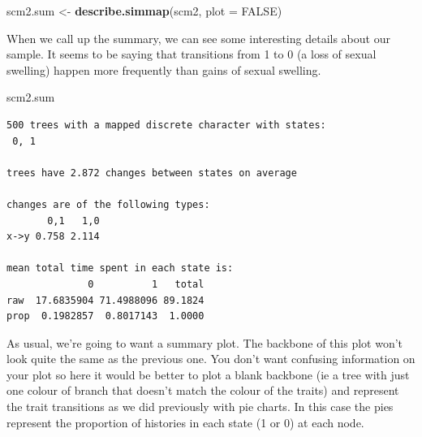 \documentclass[
]{book}
\newenvironment{Shaded}{\begin{snugshade}}{\end{snugshade}}
\newcommand{\DataTypeTok}[1]{\textcolor[rgb]{0.13,0.29,0.53}{#1}}
\newcommand{\KeywordTok}[1]{\textcolor[rgb]{0.13,0.29,0.53}{\textbf{#1}}}
\newcommand{\NormalTok}[1]{#1}
\newcommand{\OtherTok}[1]{\textcolor[rgb]{0.56,0.35,0.01}{#1}}
\newcommand{\StringTok}[1]{\textcolor[rgb]{0.31,0.60,0.02}{#1}}
\begin{document}
\begin{Shaded}
\begin{Highlighting}[]
\NormalTok{scm2.sum \textless{}{-}}\StringTok{ }\KeywordTok{describe.simmap}\NormalTok{(scm2, }\DataTypeTok{plot =} \OtherTok{FALSE}\NormalTok{)}
\end{Highlighting}
\end{Shaded}

When we call up the summary, we can see some interesting details about our sample. It seems to be saying that transitions from 1 to 0 (a loss of sexual swelling) happen more frequently than gains of sexual swelling.

\begin{Shaded}
\begin{Highlighting}[]
\NormalTok{scm2.sum}
\end{Highlighting}
\end{Shaded}

\begin{verbatim}
500 trees with a mapped discrete character with states:
 0, 1 

trees have 2.872 changes between states on average

changes are of the following types:
       0,1   1,0
x->y 0.758 2.114

mean total time spent in each state is:
              0          1   total
raw  17.6835904 71.4988096 89.1824
prop  0.1982857  0.8017143  1.0000
\end{verbatim}

As usual, we're going to want a summary plot. The backbone of this plot won't look quite the same as the previous one. You don't want confusing information on your plot so here it would be better to plot a blank backbone (ie a tree with just one colour of branch that doesn't match the colour of the traits) and represent the trait transitions as we did previously with pie charts. In this case the pies represent the proportion of histories in each state (1 or 0) at each node.
\end{document}

